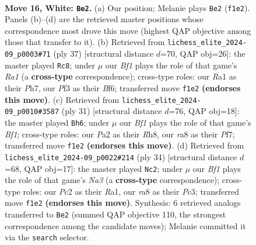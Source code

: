 \documentclass[11pt]{article}
\begin{document}
\begin{figure}[p]
\label{fig:thought-m28}
\end{figure}

\clearpage

\begin{figure}[p]\centering
\begin{subfigure}{0.46\textwidth}\centering
\resizebox{\linewidth}{!}{%
\newchessgame
\chessboard[
  setfen={r1b3k1/ppppbp1p/3n4/6p1/8/BPN2P2/P1PP2PP/R4BK1 w - - 0 16},
  showmover=false,
  pgfstyle=straightmove, color=movearrow, markmove={f1-e2}
]}
\caption{}
\end{subfigure}\hfill
\begin{subfigure}{0.46\textwidth}\centering
\resizebox{\linewidth}{!}{%
\newchessgame
\chessboard[
  setfen={r5k1/1p3ppp/p4b2/1b2p3/3rP3/5P2/PP1N1KPP/R1B4R b - - 2 19},
  showmover=false,
  pgfstyle=straightmove, color=movearrow, markmove={a8-c8}
]}
\caption{}
\end{subfigure}
\\[4pt]
\begin{subfigure}{0.46\textwidth}\centering
\resizebox{\linewidth}{!}{%
\newchessgame
\chessboard[
  setfen={4kb1r/pp2pp1p/4b1p1/3r4/8/3N4/PPP2PPP/R3KB1R b KQk - 2 16},
  showmover=false,
  pgfstyle=straightmove, color=movearrow, markmove={f8-h6}
]}
\caption{}
\end{subfigure}\hfill
\begin{subfigure}{0.46\textwidth}\centering
\resizebox{\linewidth}{!}{%
\newchessgame
\chessboard[
  setfen={r5k1/pppbbpp1/3p3p/5n2/3P1B2/N1PB3P/PP3PP1/R5K1 w - - 0 18},
  showmover=false,
  pgfstyle=straightmove, color=movearrow, markmove={a3-c2}
]}
\caption{}
\end{subfigure}
\caption{\textbf{Move 16, White: \texttt{Be2}.} (a) Our position; Melanie plays \texttt{Be2} (\texttt{f1e2}). Panels (b)--(d) are the retrieved master positions whose correspondence most drove this move (highest QAP objective among those that transfer to it). (b) Retrieved from \texttt{lichess\_elite\_2024-09\_p0003\#71} (ply 37) [structural distance $d$=70, QAP obj=26]: the master played \texttt{Rc8}; under $\mu$ our \emph{Bf1} plays the role of that game's \emph{Ra1} (a \textbf{cross-type} correspondence); cross-type roles: our \emph{R}a1 as their \emph{P}h7, our \emph{P}f3 as their \emph{B}f6; transferred move \texttt{f1e2} \textbf{(endorses this move)}. (c) Retrieved from \texttt{lichess\_elite\_2024-09\_p0010\#3587} (ply 31) [structural distance $d$=76, QAP obj=18]: the master played \texttt{Bh6}; under $\mu$ our \emph{Bf1} plays the role of that game's \emph{Bf1}; cross-type roles: our \emph{P}a2 as their \emph{R}h8, our \emph{r}a8 as their \emph{P}f7; transferred move \texttt{f1e2} \textbf{(endorses this move)}. (d) Retrieved from \texttt{lichess\_elite\_2024-09\_p0022\#214} (ply 34) [structural distance $d$=68, QAP obj=17]: the master played \texttt{Nc2}; under $\mu$ our \emph{Bf1} plays the role of that game's \emph{Na3} (a \textbf{cross-type} correspondence); cross-type roles: our \emph{P}c2 as their \emph{R}a1, our \emph{r}a8 as their \emph{P}c3; transferred move \texttt{f1e2} \textbf{(endorses this move)}. Synthesis: 6 retrieved analogs transferred to \texttt{Be2} (summed QAP objective 110, the strongest correspondence among the candidate moves); Melanie committed it via the \texttt{search} selector.}

\end{figure}
\end{document}
